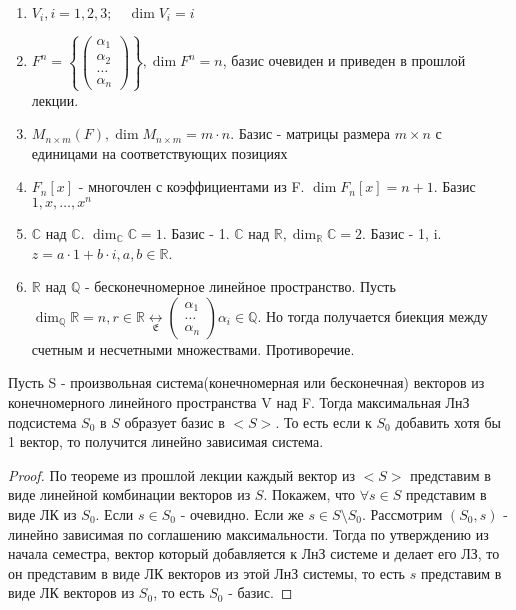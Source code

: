\begin{example}
	\begin{enumerate}
		\item\(V_i, i= 1,2,3; \quad \dim V_i = i\)
		\item\(F^n = \left\{\begin{pmatrix}
			\alpha_1 \\ \alpha_2 \\ \ldots \\\alpha_n
		\end{pmatrix}\right\}, \dim F^n = n\), базис очевиден и приведен в прошлой лекции.
		\item \(M_{n\times m}(F), \dim M_{n\times m} = m\cdot n\). Базис - матрицы размера \(m\times n\) с единицами на соответствующих позициях
		\item \(F_n[x]\) - многочлен с коэффициентами из F. \(\dim F_n[x] = n+1\). Базис \(1, x,\ldots, x^n\)
		\item \(\mathbb{C}\) над \(\mathbb{C}\). \(\dim_{\mathbb{C}}\mathbb{C} = 1\). 
		Базис - 1. 
		\(\mathbb{C}\) над \(\mathbb{R}, \dim_{\mathbb{R}}\mathbb{C} = 2\). 
		Базис - 1, i. 
		\(z = a\cdot 1 + b\cdot i, a,b\in\mathbb{R}\).
		\item \(\mathbb{R}\) над \(\mathbb{Q}\) - бесконечномерное линейное пространство. Пусть \(\dim_{\mathbb{Q}}\mathbb{R} = n, r\in\mathbb{R}\underset{\mathfrak{E}}{\longleftrightarrow} \begin{pmatrix}
			\alpha_1 \\ \ldots \\ \alpha_n
		\end{pmatrix} 
		\alpha_i\in\mathbb{Q}\). Но тогда получается биекция между счетным и несчетными множествами. Противоречие.
	\end{enumerate}
\end{example}
\begin{theorem}
	Пусть S - произвольная система(конечномерная или бесконечная) векторов из конечномерного линейного пространства V над F. Тогда максимальная ЛнЗ подсистема \(S_0\) в \(S\) образует базис в \(<S>\). То есть если к \(S_0\) добавить хотя бы 1 вектор, то получится линейно зависимая система.
\end{theorem}
\begin{proof}
	По теореме из прошлой лекции каждый вектор из \(<S>\) представим в виде линейной комбинации векторов из \(S\). Покажем, что \(\forall s\in S\) представим в виде ЛК из \(S_0\). Если \(s\in S_0\) - очевидно. Если же \(s\in S\setminus S_0\). Рассмотрим \((S_0, s)\) - линейно зависимая по соглашению максимальности. Тогда по утверждению из начала семестра, вектор который добавляется к ЛнЗ системе и делает его ЛЗ, то он представим в виде ЛК векторов из этой ЛнЗ системы, то есть \(s\) представим в виде ЛК векторов из \(S_0\), то есть \(S_0\) - базис.
\end{proof}
